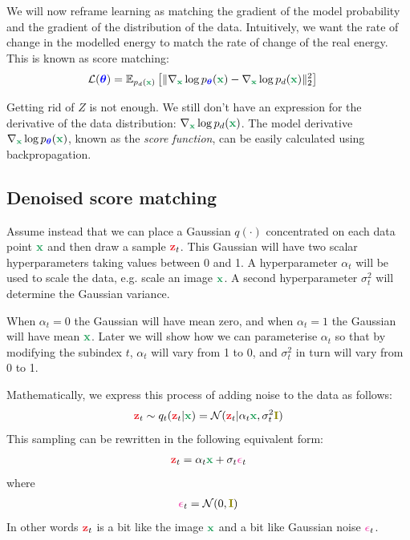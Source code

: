 \documentclass[usenames,dvipsnames]{article}
\DeclarePairedDelimiter{\norm}{\lVert}{\rVert}
\newcommand{\myvec}[1]{\mathbf{#1}}
\newcommand{\myvecsym}[1]{\boldsymbol{#1}}
\newcommand{\vx}{\myvec{\textcolor{ForestGreen}{x}}}
\newcommand{\vz}{\myvec{\textcolor{Red}{z}}}
\newcommand{\vI}{\myvec{\textcolor{olive}{I}}}
\newcommand{\vtheta}{\myvecsym{\textcolor{blue}{\theta}}}
\newcommand{\vepsilon}{\myvecsym{\textcolor{CarnationPink}{\epsilon}}}
\newcommand{\loss}{{\cal L}}
\newcommand{\gauss}{\mathcal{N}}
\newcommand{\E}{\mathbb{E}} %
\newcommand{\pT}{p_{\vtheta}}
\begin{document}
We will now reframe learning as matching the gradient of the model probability and the gradient of the distribution of the data. Intuitively, we want the rate of change in the modelled energy to match the rate of change of the real energy. This is known as score matching:
\begin{align}
  \loss(\vtheta)
  &= \E_{p_{d}(\vx)} \left[
    \norm{ \nabla_\vx \log \pT(\vx)
      - \nabla_\vx \log p_{d}(\vx)}_2^2  \right]
\end{align}

Getting rid of $Z$ is not enough. We still don't have an expression for the derivative of the data distribution: $\nabla_\vx \log p_{d}(\vx)$.  The model derivative $\nabla_\vx \log \pT(\vx)$, known as the \emph{score function}, can be easily calculated using backpropagation.



\subsection{Denoised score matching}


Assume instead that we can place a Gaussian $q(\cdot)$ concentrated on each data point $\vx$ and then draw a sample $\vz_t$. This Gaussian will have two scalar hyperparameters taking values between 0 and 1. A hyperparameter $\alpha_t$ will be used to scale the data, e.g. scale an image $\vx$. A second hyperparameter $\sigma_t^2$ will determine the Gaussian variance.

When $\alpha_t=0$ the Gaussian will have mean zero, and when $\alpha_t=1$ the Gaussian will have mean $\vx$. Later we will show how we can parameterise $\alpha_t$ so that by modifying the subindex $t$, $\alpha_t$ will vary from 1 to 0, and $\sigma_t^2$ in turn will vary from 0 to 1.  

Mathematically, we express this process of adding noise to the data as follows:
\begin{align}
\vz_t \sim q_{t}(\vz_t|\vx) = \gauss(\vz_t|\alpha_t \vx, \sigma_t^2 \vI) \nonumber
\end{align}
This sampling can be rewritten in the following equivalent form:
\begin{align}
\vz_t = \alpha_t \vx + \sigma_t \vepsilon_t
\end{align}
where
\begin{align}
\vepsilon_t = \gauss(0,\vI)
\end{align}
In other words $\vz_t$ is a bit like the image $\vx$ and a bit like Gaussian noise $\vepsilon_t$.
\end{document}
